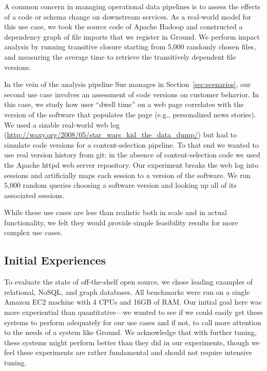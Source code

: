 \documentclass{sig-alternate}
\begin{document}
 A common concern in managing operational data pipelines is to assess the effects of a code or schema change on downstream services.
As a real-world model for this use case, we took the source code of Apache Hadoop and constructed a dependency graph of file imports that we register in Ground.
We perform impact analysis by running transitive closure starting from 5,000 randomly chosen files, and measuring the average time to retrieve the transitively dependent file versions.

 In the vein of the analysis pipeline Sue manages in Section~\ref{sec:scenarios}, our second use case involves an assessment of code versions on customer behavior. 
In this case, we study how user ``dwell time'' on a web page correlates with the version of the software that populates the page (e.g., personalized news stories). 
We used a sizable real-world web log ({\small \url{http://waxy.org/2008/05/star_wars_kid_the_data_dump/}}) %
but had to simulate code versions for a content-selection pipeline. 
To that end we wanted to use real version history from git; in the absence of content-selection code we used the Apache httpd web server repository. 
Our experiment breaks the web log into sessions and artificially maps each session to a version of the software.
We run 5,000 random queries choosing a software version and looking up all of its associated sessions.
\smallitembot

While these use cases are less than realistic both in scale and in actual functionality, we felt they would provide simple feasibility results for more complex use cases.

\subsection{Initial Experiences}
\label{sec:perf}
To evaluate the state of off-the-shelf open source, we chose leading examples of relational, NoSQL, and graph databases.
All benchmarks were run on a single Amazon EC2  machine with 4 CPUs and 16GB of RAM. 
Our initial goal here was more experiential than quantitative---we wanted to see if we could easily get these systems to perform adequately for our use cases and if not, to call more attention to the needs of a system like Ground.
We acknowledge that with further tuning, these systems might perform better than they did in our experiments, though we feel these experiments are rather fundamental and should not require intensive tuning.
\end{document}
